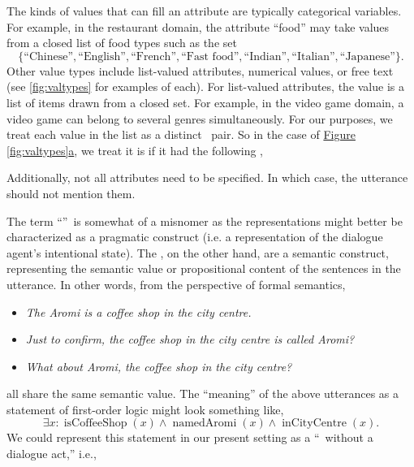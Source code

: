 The kinds of values that can fill an attribute are typically categorical
variables. For example, in the restaurant domain, the attribute ``food'' may
take values from a closed list of food types such as the set
\[\{\textrm{``Chinese''}, \textrm{``English''}, \textrm{``French''},
\textrm{``Fast food''}, \textrm{``Indian''}, \textrm{``Italian''},
\textrm{``Japanese''}\}.\] Other value types include list-valued attributes,
numerical values, or free text (see \autoref{fig:valtypes} for examples of
each). For list-valued attributes, the value is a list of items drawn from a
closed set.  For example, in the video game domain, a video game can belong to
several genres simultaneously.  For our purposes, we treat each value in the
list as a distinct \attributevalue~pair. So in the case of
\hyperref[fig:valtypes]{Figure \ref{fig:valtypes}a}, we treat it is if it had
the following \meaningrepresentation,
\begin{center} 
    {} 
    {} 
    {} 
    {} 
    {}
\end{center} 
Additionally, not all attributes need to be specified. In which case, the
utterance should not mention them.

The term ``\meaningrepresentation''~is somewhat of a misnomer as the
representations might better be characterized as a pragmatic construct (i.e. a
representation of the dialogue agent's intentional state).  The
\attributevalues, on the other hand, are a semantic construct, representing the
semantic value or propositional content of the sentences in the utterance.  In
other words, from the perspective of formal semantics, 
\begin{itemize} 
    \item \textit{The Aromi is a coffee shop in the city centre.}  
    \item \textit{Just to confirm, the coffee shop in the city centre is called Aromi?}  
    \item \textit{What
about Aromi, the coffee shop in the city centre?}  
\end{itemize} 
\noindent all share the same semantic value. The ``meaning'' of the above
utterances as a statement of first-order logic might look something like,
\[\exists x : \operatorname{isCoffeeShop}(x) \wedge
\operatorname{namedAromi}(x) \wedge \operatorname{inCityCentre}(x).\] We could
represent this statement in our present setting as a
``\meaningrepresentation~without a dialogue act,'' i.e.,
\begin{center}  \end{center} ~\\
    
